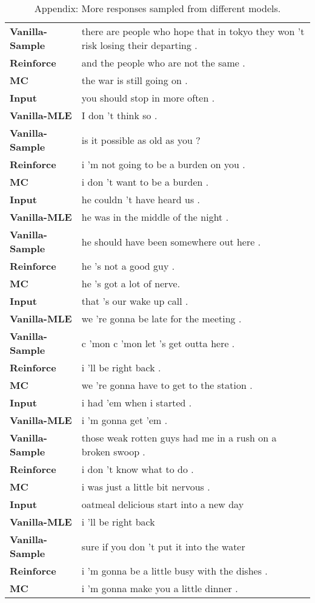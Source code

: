 \documentclass[11pt]{article}
\begin{document}
\begin{table*}[!htb]
\begin{tabular}{p{4cm}p{8cm}}
{\bf Vanilla-Sample}&there are people who hope that in tokyo they won 't risk losing their departing .\\
{\bf Reinforce}&and the people who are not the same .\\
{\bf MC}&the war is still going on .\\\hline
{\bf Input}&you should stop in more often .\\
{\bf Vanilla-MLE}&I don 't think so .\\
{\bf Vanilla-Sample}&is it possible as old as you ?\\
{\bf Reinforce}&i 'm not going to be a burden on you .\\
{\bf MC}&i don 't want to be a burden .\\\hline{\bf Input}&he couldn 't have heard us .\\
{\bf Vanilla-MLE}&he was in the middle of the night  .\\
{\bf Vanilla-Sample}&he should have been somewhere out here .\\
{\bf Reinforce}&he 's not a good guy .\\
{\bf MC}&he 's got a lot of nerve.\\\hline
{\bf Input}&that 's our wake up call .\\
{\bf Vanilla-MLE}&we 're gonna be late for the meeting .\\
{\bf Vanilla-Sample}&c 'mon c 'mon let 's get outta here .\\
{\bf Reinforce}&i 'll be right back .\\
{\bf MC}&we 're gonna have to get to the station .\\\hline
{\bf Input}&i had 'em when i started .\\
{\bf Vanilla-MLE}&i 'm gonna get 'em .\\
{\bf Vanilla-Sample}&those weak rotten guys had me in a rush on a broken swoop .\\
{\bf Reinforce}&i don 't know what to do .\\
{\bf MC}&i was just a little bit nervous .\\\hline
{\bf Input}&oatmeal delicious start into a new day\\
{\bf Vanilla-MLE}& i 'll be right back\\
{\bf Vanilla-Sample}&sure if you don 't put it into the water\\
{\bf Reinforce}&i 'm gonna be a little busy with the dishes .\\
{\bf MC}&i 'm gonna make you a little dinner .\\\hline
\end{tabular}
\caption{Appendix: More responses sampled from different models.}
\label{example-appendix2}
\end{table*}
\end{document}

